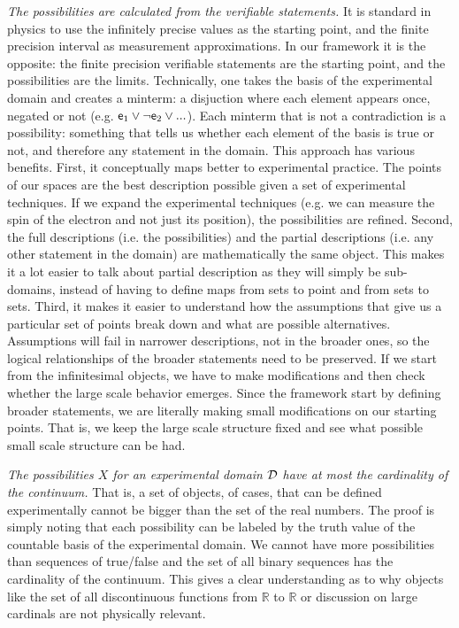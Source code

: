 \documentclass[twocolumn]{article}
\begin{document}
\textit{The possibilities are calculated from the verifiable statements.} It is standard in physics to use the infinitely precise values as the starting point, and the finite precision interval as measurement approximations. In our framework it is the opposite: the finite precision verifiable statements are the starting point, and the possibilities are the limits. Technically, one takes the basis of the experimental domain and creates a minterm: a disjuction where each element appears once, negated or not (e.g. $\stmt[e]_1\OR \NOT \stmt[e]_2 \OR ...$). Each minterm that is not a contradiction is a possibility: something that tells us whether each element of the basis is true or not, and therefore any statement in the domain. This approach has various benefits. First, it conceptually maps better to experimental practice. The points of our spaces are the best description possible given a set of experimental techniques. If we expand the experimental techniques (e.g. we can measure the spin of the electron and not just its position), the possibilities are refined. Second, the full descriptions (i.e. the possibilities) and the partial descriptions (i.e. any other statement in the domain) are mathematically the same object. This makes it a lot easier to talk about partial description as they will simply be sub-domains, instead of having to define maps from sets to point and from sets to sets. Third, it makes it easier to understand how the assumptions that give us a particular set of points break down and what are possible alternatives. Assumptions will fail in narrower descriptions, not in the broader ones, so the logical relationships of the broader statements need to be preserved. If we start from the infinitesimal objects, we have to make modifications and then check whether the large scale behavior emerges. Since the framework start by defining broader statements, we are literally making small modifications on our starting points. That is, we keep the large scale structure fixed and see what possible small scale structure can be had.

\textit{The possibilities $X$ for an experimental domain $\edomain$ have at most the cardinality of the continuum.} That is, a set of objects, of cases, that can be defined experimentally cannot be bigger than the set of the real numbers. The proof is simply noting that each possibility can be labeled by the truth value of the countable basis of the experimental domain. We cannot have more possibilities than sequences of true/false and the set of all binary sequences has the cardinality of the continuum. This gives a clear understanding as to why objects like the set of all discontinuous functions from $\mathbb{R}$ to $\mathbb{R}$ or discussion on large cardinals are not physically relevant.
\end{document}
